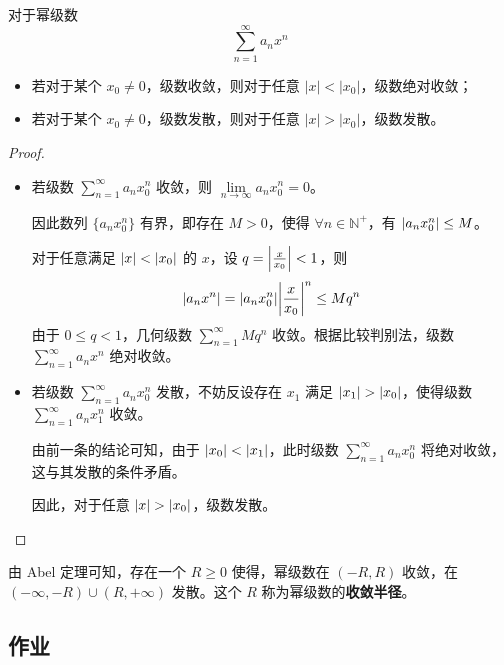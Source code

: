 \begin{theorem}[Abel 定理]
    对于幂级数
    $$
    \sum_{n = 1}^{\infty} a_n x^{n}
    $$
    \begin{itemize}
        \item 若对于某个 $x_0 \neq 0$，级数收敛，则对于任意 $|x| < |x_0|$，级数绝对收敛；
        \item 若对于某个 $x_0 \neq 0$，级数发散，则对于任意 $|x| > |x_0|$，级数发散。
    \end{itemize}

    \begin{proof}
        \begin{itemize}
            \item 若级数 $\sum\limits_{n = 1}^{\infty} a_n x_0^{n}$ 收敛，则 $\lim\limits_{n \to \infty} a_n x_0^{n} = 0$。

            因此数列 $\{a_n x_0^{n}\}$ 有界，即存在 $M > 0$，使得 $\forall n \in \mathbb{N}^{+}$，有 $\abs{a_n x_0^{n}} \le M$。
            
            对于任意满足 $\abs{x} < \abs{x_0}$ 的 $x$，设 $q = \abs{\frac{x}{x_0}} < 1$，则
            $$
            \abs{a_n x^{n}} = \abs{a_n x_0^{n}} \abs{\frac{x}{x_0}}^{n} \le M q^{n}
            $$
            由于 $0 \le q < 1$，几何级数 $\sum\limits_{n = 1}^{\infty} M q^{n}$ 收敛。根据比较判别法，级数 $\sum\limits_{n = 1}^{\infty} a_n x^{n}$ 绝对收敛。

            \item 若级数 $\sum\limits_{n = 1}^{\infty} a_n x_0^{n}$ 发散，不妨反设存在 $x_1$ 满足 $\abs{x_1} > \abs{x_0}$，使得级数 $\sum\limits_{n = 1}^{\infty} a_n x_1^{n}$ 收敛。

            由前一条的结论可知，由于 $\abs{x_0} < \abs{x_1}$，此时级数 $\sum\limits_{n = 1}^{\infty} a_n x_0^{n}$ 将绝对收敛，这与其发散的条件矛盾。

            因此，对于任意 $\abs{x} > \abs{x_0}$，级数发散。
        \end{itemize}
    \end{proof}
\end{theorem}

由 Abel 定理可知，存在一个 $R \ge 0$ 使得，幂级数在 $(-R, R)$ 收敛，在 $(- \infty, -R) \cup (R, + \infty)$ 发散。这个 $R$ 称为幂级数的\textbf{收敛半径}。

\subsection{作业}

